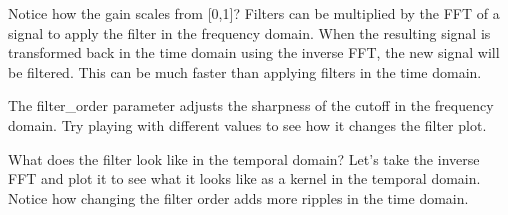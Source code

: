 \documentclass[letterpaper,10pt,english]{sphinxmanual}
\begin{document}
\noindent{}

Notice how the gain scales from {[}0,1{]}?  Filters can be multiplied by the FFT of a signal to apply the filter in the frequency domain. When the resulting signal is transformed back in the time domain using the inverse FFT, the new signal will be filtered. This can be much faster than applying filters in the time domain.

The filter\_order parameter adjusts the sharpness of the cutoff in the frequency domain.  Try playing with different values to see how it changes the filter plot.

\begin{sphinxVerbatim}[commandchars=\\\{\}]
  
  
  


           

  
\end{sphinxVerbatim}

\noindent{}

What does the filter look like in the temporal domain?  Let’s take the inverse FFT and plot it to see what it looks like as a kernel in the temporal domain.  Notice how changing the filter order adds more ripples in the time domain.
\end{document}
